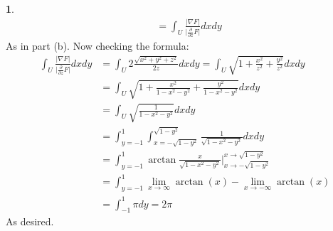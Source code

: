 \documentclass[10.5pt]{article}
\theoremstyle{definition}
\newtheorem{pb}{}
\newcommand{\abs}[1]{\lvert#1\rvert}
\newcommand{\parx}{\frac{\partial}{\partial x}}
\newcommand{\pary}{\frac{\partial}{\partial y}}
\newcommand{\parz}{\frac{\partial}{\partial z}}
\begin{document}
\begin{pb}
\begin{align*}
            &= \int_U \frac{\abs{\nabla F}}{\abs{\parz F}}dxdy
        \end{align*}
        As in part (b). Now checking the formula:
        \begin{align*}
            \int_U \frac{\abs{\nabla F}}{\abs{\parz F}}dxdy &= \int_U 2\frac{\sqrt{x^2 + y^2 + z^2}}{2z}dxdy = \int_U \sqrt{1 + \frac{x^2}{z^2} + \frac{y^2}{z^2}}dxdy \\
            &= \int_U \sqrt{1 + \frac{x^2}{1-x^2-y^2} + \frac{y^2}{1-x^2-y^2}}dxdy \\
            &= \int_U \sqrt{\frac{1}{1-x^2-y^2}}dxdy \\
            &= \int_{y=-1}^1 \int_{x=-\sqrt{1-y^2}}^{\sqrt{1-y^2}} \frac{1}{\sqrt{1-x^2-y^2}}dxdy \\
            &= \int_{y=-1}^1 \arctan \frac{x}{\sqrt{1-x^2-y^2}}\vert_{x \to -\sqrt{1-y^2}}^{x \to \sqrt{1-y^2}} \\
            &= \int_{y=-1}^1 \lim_{x \to \infty}\arctan(x) - \lim_{x \to -\infty}\arctan(x) \\
            &= \int_{-1}^1 \pi dy = 2\pi
        \end{align*}
        As desired.
    \end{pb}
\end{document}
